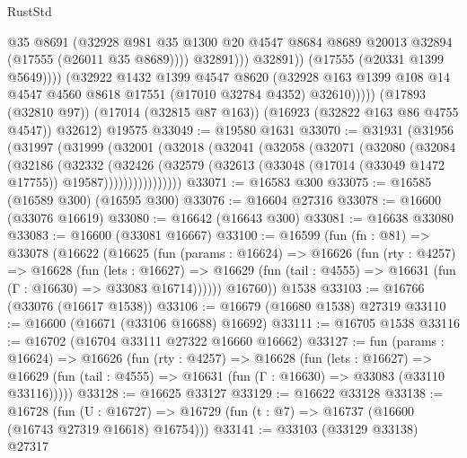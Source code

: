 \begin{lexlean}{RustStd}
\begin{coremodule}
                            @35
                            @8691
                            (@32928
                              @981
                              @35
                              @1300
                              @20
                              @4547
                              @8684
                              @8689
                              @20013
                              @32894
                              (@17555 (@26011 @35 @8689))))
                          @32891)))
                    @32891))
                (@17555 (@20331 @1399 @5649))))
            (@32922
              @1432
              @1399
              @4547
              @8620
              (@32928 @163 @1399 @108 @14 @4547 @4560 @8618 @17551 (@17010 @32784 @4352) @32610)))))
      (@17893 (@32810 @97))
      (@17014 (@32815 @87 @163))
      (@16923 (@32822 @163 @86 @4755 @4547))
      @32612)
    @19575
@33049 := @19580 @1631
@33070 := @31931
    (@31956
      (@31997
        (@31999
          (@32001
            (@32018
              (@32041
                (@32058
                  (@32071
                    (@32080
                      (@32084
                        (@32186
                          (@32332
                            (@32426
                              (@32579
                                (@32613
                                  (@33048 (@17014 (@33049 @1472 @17755)) @19587))))))))))))))))
@33071 := @16583 @300
@33075 := @16585 (@16589 @300) (@16595 @300)
@33076 := @16604 @27316
@33078 := @16600 (@33076 @16619)
@33080 := @16642 (@16643 @300)
@33081 := @16638 @33080
@33083 := @16600 (@33081 @16667)
@33100 := @16599
    (fun (fn : @81) =>
    @33078
      (@16622
        (@16625
          (fun (params : @16624) =>
          @16626
            (fun (rty : @4257) =>
            @16628
              (fun (lets : @16627) =>
              @16629 (fun (tail : @4555) => @16631 (fun (Γ : @16630) => @33083 @16714))))))
        @16760))
    @1538
@33103 := @16766 (@33076 (@16617 @1538))
@33106 := @16679 (@16680 @1538) @27319
@33110 := @16600 (@16671 (@33106 @16688) @16692)
@33111 := @16705 @1538
@33116 := @16702 (@16704 @33111 @27322 @16660 @16662)
@33127 := fun (params : @16624) =>
  @16626
    (fun (rty : @4257) =>
    @16628
      (fun (lets : @16627) =>
      @16629 (fun (tail : @4555) => @16631 (fun (Γ : @16630) => @33083 (@33110 @33116)))))
@33128 := @16625 @33127
@33129 := @16622 @33128
@33138 := @16728
    (fun (U : @16727) => @16729 (fun (t : @7) => @16737 (@16600 (@16743 @27319 @16618) @16754)))
@33141 := @33103 (@33129 @33138) @27317

\end{coremodule}
\end{lexlean}
